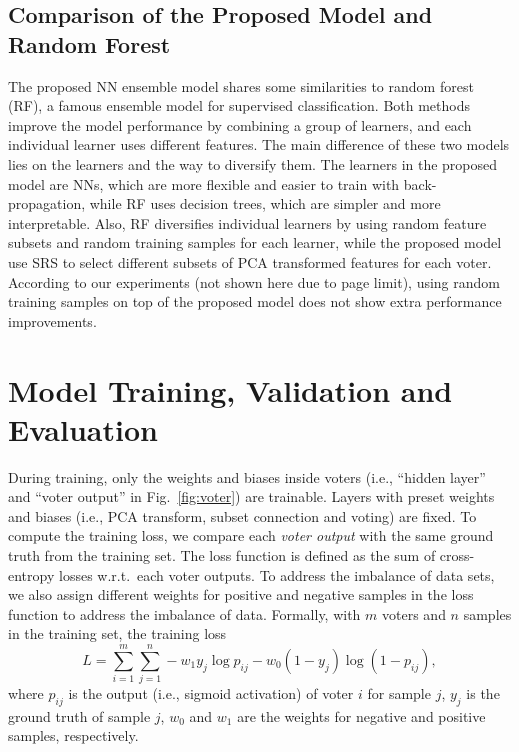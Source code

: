 \documentclass[10pt, final, letter, twocolumns]{IEEEtran}
\begin{document}
\subsection{Comparison of the Proposed Model and Random Forest}\vspace{-1mm}
The proposed NN ensemble model shares some similarities to random forest (RF), a famous ensemble model for supervised classification. Both methods improve the model performance by combining a group of learners, and each individual learner uses different features. The main difference of these two models lies on the learners and the way to diversify them. The learners in the proposed model are NNs, which are more flexible and easier to train with back-propagation, while RF uses decision trees, which are simpler and more interpretable. Also, RF diversifies individual learners by using random feature subsets and random training samples for each learner, while the proposed model use SRS to select different subsets of PCA transformed features for each voter. According to our experiments (not shown here due to page limit), using random training samples on top of the proposed model does not show extra performance improvements.

\vspace{-2mm}
\section{Model Training, Validation and Evaluation}
\vspace{-1mm}
\label{sec:model-train-valid-eval}
During training, only the weights and biases inside voters (i.e., ``hidden layer'' and ``voter output'' in Fig.~\ref{fig:voter}) are trainable. Layers with preset weights and biases (i.e., PCA transform, subset connection and voting) are fixed. To compute the training loss, we compare each \emph{voter output} with the same ground truth from the training set. The loss function is defined as the sum of cross-entropy losses w.r.t.\ each voter outputs. To address the imbalance of data sets, we also assign different weights for positive and negative samples in the loss function to address the imbalance of data. Formally, with $m$ voters and $n$ samples in the training set, the training loss
\vspace{-2mm}\begin{equation}
L = \sum_{i=1}^m \sum_{j=1}^n -w_1y_j\log p_{ij} - w_0(1-y_j)\log(1-p_{ij}),
\end{equation}
where $p_{ij}$ is the output (i.e., sigmoid activation) of voter $i$ for sample $j$, $y_j$ is the ground truth of sample $j$, $w_0$ and $w_1$ are the weights for negative and positive samples, respectively.
\end{document}
